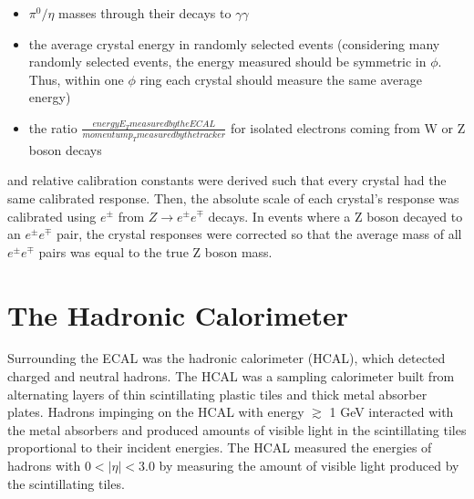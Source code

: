\begin{itemize}
	\item $\pi^{0}/\eta$ masses through their decays to $\gamma\gamma$
	\item the average crystal energy in randomly selected events 
		(considering many randomly selected events, the energy measured should be symmetric in $\phi$.  Thus, within one $\phi$ ring each crystal should measure the same average energy)
	\item the ratio $\frac{energy E_{T} measured by the ECAL}{momentum p_{T} measured by the tracker}$ for isolated electrons coming from W or Z boson decays
\end{itemize}

and relative calibration constants were derived such that every crystal had the same calibrated response.  
Then, the absolute scale of each crystal's response was calibrated using $e^{\pm}$ from 
$Z \rightarrow e^{\pm}e^{\mp}$ decays.  In events where a Z boson decayed to an $e^{\pm}e^{\mp}$ pair, the 
crystal responses were corrected so that the average mass of all $e^{\pm}e^{\mp}$ pairs was equal to 
the true Z boson mass.

\section{The Hadronic Calorimeter}
\label{sec:hcalDescription}
Surrounding the ECAL was the hadronic calorimeter (HCAL), which detected charged and neutral hadrons.  The 
HCAL was a sampling calorimeter built from alternating layers of thin scintillating plastic tiles and thick 
metal absorber plates.  Hadrons impinging on the HCAL with energy $\gtrsim$ 1 GeV interacted with the metal absorbers and produced amounts 
of visible light in the scintillating tiles proportional to their incident energies.  The HCAL 
measured the energies of hadrons with $0 < |\eta| < 3.0$ by measuring the amount of visible light produced 
by the scintillating tiles.

